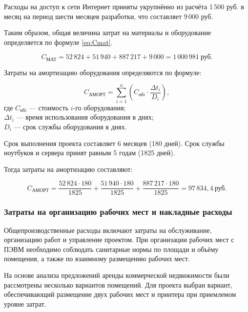 Расходы на доступ к сети Интернет приняты укрупнённо из расчёта 1\,500 руб. в месяц на период шести месяцев разработки, что составляет 9\,000 руб.

Таким образом, общая величина затрат на материалы и оборудование определяется по формуле \eqref{eq:Cmat}.

\begin{equation}
C_{\text{МАТ}} = 52\,824 + 51\,940 + 887\,217 + 9\,000 = 1\,000\,981 \ \text{руб.}
\label{eq:Cmat}
\end{equation}

Затраты на амортизацию оборудования определяются по формуле:

\begin{equation}
C_{\text{АМОРТ}} = \sum_{i=1}^{n} \left( C_{\text{об}i} \cdot \frac{\Delta t_i}{D_i} \right),
\end{equation}
где $C_{\text{об}i}$ — стоимость $i$-го оборудования; \\ $\Delta t_i$ — время использования оборудования в днях; \\ $D_i$ — срок службы оборудования в днях.

Срок выполнения проекта составляет 6 месяцев (180 дней). Срок службы ноутбуков и сервера принят равным 5 годам (1825 дней).

Тогда затраты на амортизацию составляют:

$$
C_{\text{АМОРТ}} =
\frac{52\,824 \cdot 180}{1825} +
\frac{51\,940 \cdot 180}{1825} +
\frac{887\,217 \cdot 180}{1825}
= 97\,834{,}4 \ \text{руб.}
$$

\subsubsection{Затраты на организацию рабочих мест и накладные расходы}

Общепроизводственные расходы включают затраты на обслуживание, организацию работ и управление проектом. При организации рабочих мест с ПЭВМ необходимо соблюдать санитарные нормы по площади и объёму помещения, а также по взаимному размещению рабочих мест.

На основе анализа предложений аренды коммерческой недвижимости были рассмотрены несколько вариантов помещений. Для проекта выбран вариант, обеспечивающий размещение двух рабочих мест и принтера при приемлемом уровне затрат.

